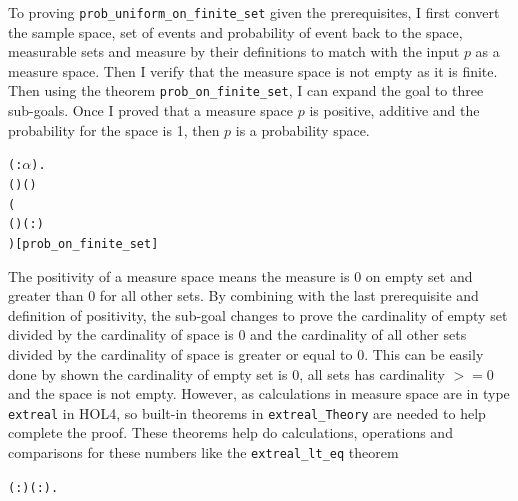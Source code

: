 \documentclass{article}
\begin{document}
To proving \verb|prob_uniform_on_finite_set| given the prerequisites, I first convert the sample space,
set of events and probability of event back
to the space, measurable sets and measure by their definitions to match with the input $p$ as a measure space. Then I
verify that the measure space is not empty as it is finite.
Then using the theorem \verb|prob_on_finite_set|, I can
expand the goal to three sub-goals. Once I proved that a measure space $p$ is positive, additive and the probability
for the space is 1, then $p$ is a probability space.

\begin{alltt}
  \HOLTokenTurnstile{} \HOLSymConst{\HOLTokenForall{}}( :\ensuremath{\alpha} ).
      ( ) \HOLSymConst{\HOLTokenConj{}}   \HOLSymConst{=}  ( ) \HOLSymConst{\HOLTokenImp{}}
     (  \HOLSymConst{\HOLTokenEquiv{}}
        \HOLSymConst{\HOLTokenConj{}}   ( ) \HOLSymConst{=} ( :) \HOLSymConst{\HOLTokenConj{}}
       )\hfill{[prob_on_finite_set]}
\end{alltt}

The positivity of a measure space means the measure is 0 on empty set and greater than 0 for all other sets. By combining
with the last prerequisite and definition of positivity, the sub-goal changes to prove the cardinality of empty set divided
by the cardinality of space is 0 and the cardinality of all other sets divided by the cardinality of space is greater
or equal to 0. This can be easily done by shown the cardinality of empty set is 0, all sets has cardinality $>=0$ and
the space is not empty. However, as calculations in measure space are in type \verb|extreal| in HOL4, so built-in theorems
in \verb|extreal_Theory| are needed to help complete the proof. These theorems help do calculations, operations and
comparisons for these numbers like the \verb|extreal_lt_eq| theorem

\begin{alltt}
  \HOLTokenTurnstile{} \HOLSymConst{\HOLTokenForall{}}( :) ( :).   \HOLSymConst{\HOLTokenLt{}}   \HOLSymConst{\HOLTokenEquiv{}}  \HOLSymConst{\HOLTokenLt{}} 
\end{alltt}
\end{document}
